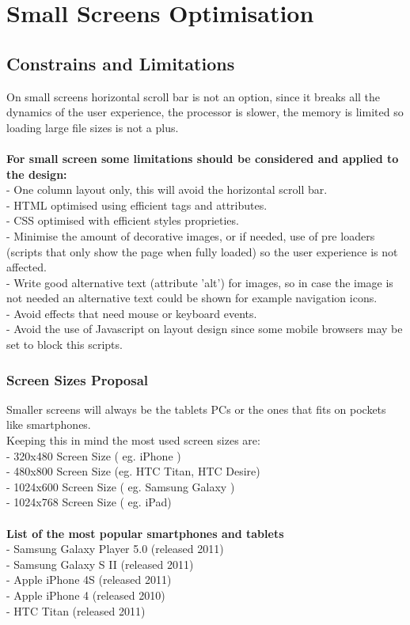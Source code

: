 

\section{Small Screens Optimisation}

\subsection{Constrains and Limitations}
On small screens horizontal scroll bar is not an option, since it breaks all the dynamics of the user experience, the processor is slower, the memory is limited so loading large file sizes is not a plus.\\
\\
\noindent \textbf{For small screen some limitations should be considered and applied to the design:}\\
- One column layout only, this will avoid the horizontal scroll bar.\\
- HTML optimised using efficient tags and attributes.\\
- CSS optimised with efficient styles proprieties.\\
- Minimise the amount of decorative images, or if needed, use of pre loaders (scripts that only show the page when fully loaded) so the user experience is not affected.\\
- Write good alternative text (attribute 'alt')  for images, so in case the image is not needed an alternative text could be shown for example navigation icons.\\
- Avoid effects that need mouse or keyboard events.\\
- Avoid the use of Javascript on layout design since some mobile browsers may be set to block this scripts.

\subsubsection{Screen Sizes Proposal}
Smaller screens will always be the tablets PCs or the ones that fits on pockets like smartphones.\\
Keeping this in mind the most used screen sizes are:\\
- 320x480 Screen Size ( eg. iPhone )\\ 	%
- 480x800 Screen Size (eg. HTC Titan, HTC Desire)\\ %
- 1024x600 Screen Size ( eg. Samsung Galaxy )\\
- 1024x768 Screen Size ( eg. iPad)\\
\\
\noindent \textbf{List of the most popular smartphones and tablets}\\
- Samsung Galaxy Player 5.0 (released 2011)\\
- Samsung Galaxy S II (released 2011)\\
- Apple iPhone 4S (released 2011)\\
- Apple iPhone 4 (released 2010)\\
- HTC Titan (released 2011)\\

